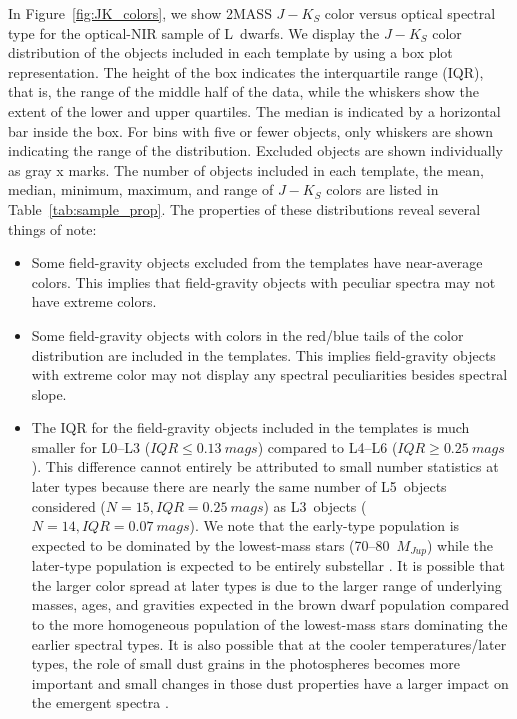 \documentclass[modern]{aastex61}
\begin{document}
In Figure~\ref{fig:JK_colors}, we show 2MASS $J-K_S$ color versus optical spectral type for the optical-NIR sample of L~dwarfs.
We display the $J-K_S$ color distribution of the objects included in each template by using a box plot representation. The height of the box indicates the interquartile range (IQR), that is, the range of the middle half of the data, while the whiskers show the extent of the lower and upper quartiles. The median is indicated by a horizontal bar inside the box. For bins with five or fewer objects, only whiskers are shown indicating the range of the distribution. Excluded objects are shown individually as gray x marks.
The number of objects included in each template, the mean, median, minimum, maximum, and range of $J-K_S$ colors are listed in Table~\ref{tab:sample_prop}.
The properties of these distributions reveal several things of note:
\begin{itemize}
\item Some field-gravity objects excluded from the templates have near-average colors. This implies that field-gravity objects with peculiar spectra may not have extreme colors.
\item Some field-gravity objects with colors in the red/blue tails of the color distribution are included in the templates. This implies field-gravity objects with extreme color may not display any spectral peculiarities besides spectral slope.
\item The IQR for the field-gravity objects included in the templates is much smaller for L0--L3 ($IQR\le0.13~mags$) compared to L4--L6 ($IQR\ge0.25~mags$).
This difference cannot entirely be attributed to small number statistics at later types because there are nearly the same number of L5~objects considered ($N=15,IQR=0.25~mags$) as L3~objects ($N=14,IQR=0.07~mags$).
We note that the early-type population is expected to be dominated by the lowest-mass stars (70--80~$M_{Jup}$) while the later-type population is expected to be entirely substellar \citep{Burrows01}.
It is possible that the larger color spread at later types is due to the larger range of underlying masses, ages, and gravities expected in the brown dwarf population compared to the more homogeneous population of the lowest-mass stars dominating the earlier spectral types.
It is also possible that at the cooler temperatures/later types, the role of small dust grains in the photospheres becomes more important and small changes in those dust properties have a larger impact on the emergent spectra \citep{Burgasser08_blue,Marocco:2014kr,Hiranaka:2016jm}.
\end{itemize}
\end{document}
